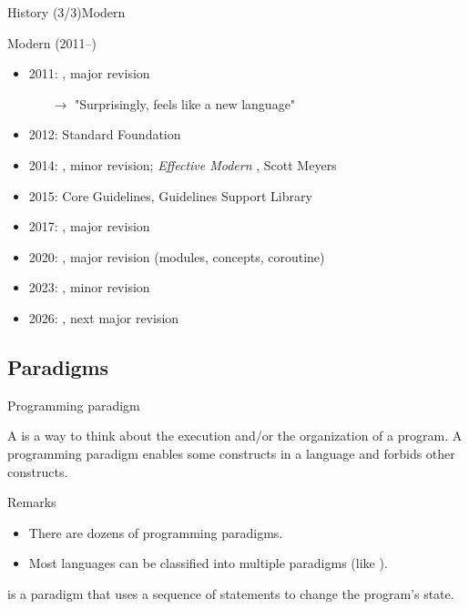 \begin{frame}{\CCLang History (3/3)}{Modern \CCLang}
  \begin{block}{Modern \CCLang (2011--)}
    \begin{itemize}
    \item
      2011: , major revision
      \begin{itemize}
      \item[$\to$]
        "Surprisingly,  feels like a new language"
      \end{itemize}
    \item
      2012: Standard \CCLang Foundation
    \item
      2014: , minor revision; \emph{Effective Modern \CCLang}, Scott Meyers
    \item
      2015: \CCLang Core Guidelines, Guidelines Support Library
    \item
      2017: , major revision
    \item
      2020: , major revision (modules, concepts, coroutine)
    \item
      2023: , minor revision
    \item
      2026: , next major revision
    \end{itemize}
  \end{block}
\end{frame}

\subsection{\CCLang Paradigms}

\begin{frame}{Programming paradigm}{}
  \begin{definition}
    A  is a way to think about the execution and/or the organization of a program. A programming paradigm enables some constructs in a language and forbids other constructs.
  \end{definition}

  \begin{block}{Remarks}
    \begin{itemize}
    \item
      There are dozens of programming paradigms.
    \item
      Most languages can be classified into multiple paradigms (like \CCLang).
    \end{itemize}
  \end{block}

  \begin{example}
     is a paradigm that uses a sequence of statements to change the program's state.
  \end{example}
\end{frame}

